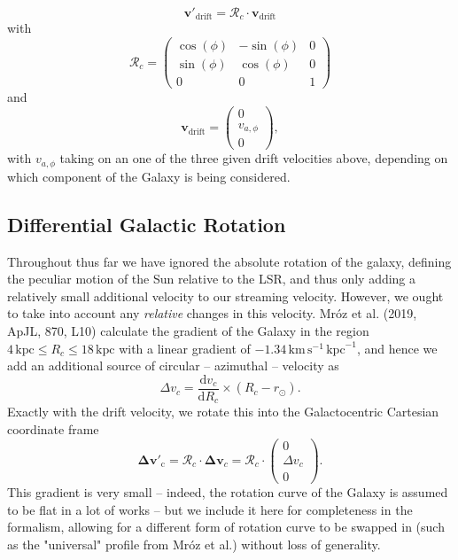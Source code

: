 \documentclass[fleqn,usenatbib]{mnras}
\begin{document}
\begin{equation}
    \bm{v}{'}_\mathrm{\!\!drift} = \bm{\mathcal{R}}_c \cdot \bm{v}_\mathrm{drift}
\end{equation}
with
\begin{equation}
\bm{\mathcal{R}}_c = \left(\begin{matrix} \cos(\phi) & -\sin(\phi) & 0 \\ \sin(\phi) & \cos(\phi) & 0 \\ 0 & 0 & 1 \end{matrix}\right)
\label{eq:cylrot}
\end{equation}
and
\begin{equation}
\bm{v}_\mathrm{drift} = \left(\begin{matrix} 0 \\ v_{a,\phi} \\ 0 \end{matrix}\right),
\end{equation}
with $v_{a,\phi}$ taking on an one of the three given drift velocities above, depending on which component of the Galaxy is being considered.

\subsection{Differential Galactic Rotation}
Throughout thus far we have ignored the absolute rotation of the galaxy, defining the peculiar motion of the Sun relative to the LSR, and thus only adding a relatively small additional velocity to our streaming velocity.
However, we ought to take into account any \textit{relative} changes in this velocity.
Mr\'{o}z et al. (2019, ApJL, 870, L10) calculate the gradient of the Galaxy in the region $4\,\mathrm{kpc} \leq R_c \leq 18\,\mathrm{kpc}$ with a linear gradient of $-1.34\,\mathrm{km}\,\mathrm{s}^{-1}\,\mathrm{kpc}^{-1}$, and hence we add an additional source of circular -- azimuthal -- velocity as
\begin{equation}
    \Delta v_c = \frac{\mathrm{d}v_c}{\mathrm{d}R_c} \times (R_c - r_\odot).
\end{equation}
Exactly with the drift velocity, we rotate this into the Galactocentric Cartesian coordinate frame
\begin{equation}
    \bm{\Delta v}{'}_\mathrm{\!\!c} = \bm{\mathcal{R}}_c \cdot \bm{\Delta v}_c = \bm{\mathcal{R}}_c \cdot \left(\begin{matrix} 0 \\ \Delta v_c \\ 0 \end{matrix}\right).
\end{equation}
This gradient is very small -- indeed, the rotation curve of the Galaxy is assumed to be flat in a lot of works -- but we include it here for completeness in the formalism, allowing for a different form of rotation curve to be swapped in (such as the "universal" profile from Mr\'{o}z et al.) without loss of generality.
\end{document}
